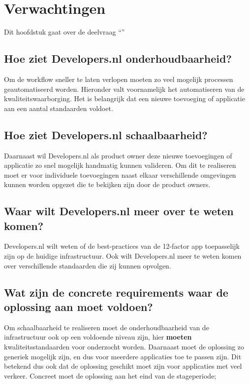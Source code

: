 \chapter{Verwachtingen}

\label{Verwachtingen}

Dit hoofdstuk gaat over de deelvraag \enquote{\deelverwachtingen}

\section{Hoe ziet Developers.nl onderhoudbaarheid?}

Om de workflow sneller te laten verlopen moeten zo veel mogelijk processen geautomatiseerd worden. Hieronder valt voornamelijk het automatiseren van de kwaliteitswaarborging. Het is belangrijk dat een nieuwe toevoeging of applicatie aan een aantal standaarden voldoet. 

\section{Hoe ziet Developers.nl schaalbaarheid?}

Daarnaast wil Developers.nl als product owner deze nieuwe toevoegingen of applicatie zo snel mogelijk handmatig kunnen valideren. Om dit te realiseren moet er voor individuele toevoegingen naast elkaar verschillende omgevingen kunnen worden opgezet die te bekijken zijn door de product owners.

\section{Waar wilt Developers.nl meer over te weten komen?}

Developers.nl wilt weten of de best-practices van de 12-factor app toepasselijk zijn op de huidige infrastructuur. Ook wilt Developers.nl meer te weten komen over verschillende standaarden die zij kunnen opvolgen.

\section{Wat zijn de concrete requirements waar de oplossing aan moet voldoen?}

Om schaalbaarheid te realiseren moet de onderhoudbaarheid van de infrastructuur ook op een voldoende niveau zijn, hier \textbf{moeten} kwaliteitsstandaarden voor onderzocht worden. Daarnaast moet de oplossing zo generiek mogelijk zijn, en dus voor meerdere applicaties toe te passen zijn. Dit betekend dus ook dat de oplossing geschikt moet zijn voor applicaties met veel verkeer. Concreet moet de oplossing aan het eind van de stageperiode;

